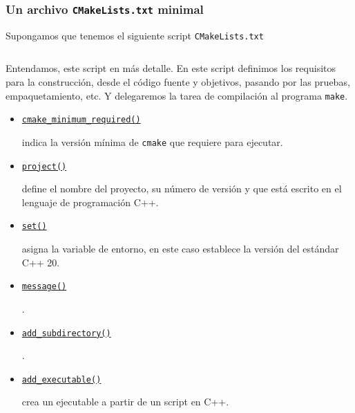\begin{frame}[fragile]
	\frametitle{Un archivo \lstinline{CMakeLists.txt} minimal}
	Supongamos que tenemos el siguiente script \lstinline{CMakeLists.txt}

	\inputminted{cmake}{CMakeList.txt.sample}

	Entendamos, este script en más detalle.
	En este script definimos los requisitos para la construcción, desde
	el código fuente y objetivos, pasando por las pruebas, empaquetamiento, etc.
	Y delegaremos la tarea de compilación al programa \lstinline{make}.

	\begin{itemize}
		\item

		\href{https://cmake.org/cmake/help/latest/command/cmake_minimum_required.html}{\lstinline{cmake_minimum_required()}}

		indica la versión mínima de \lstinline{cmake} que requiere para ejecutar.

		\item
		
		\href{https://cmake.org/cmake/help/latest/command/project.html}{\lstinline{project()}}

		define el nombre del proyecto, su número de versión y que
		está escrito en el lenguaje de programación C++.
		
		\item

		\href{https://cmake.org/cmake/help/latest/command/set.html}{\lstinline{set()}}

		asigna la variable de entorno, en este caso establece la versión del estándar C++ 20.


		\item

		\href{https://cmake.org/cmake/help/latest/command/message.html}{\lstinline{message()}}
		
		.

		\item

		\href{https://cmake.org/cmake/help/latest/command/add_subdirectory.html}{\lstinline{add_subdirectory()}}

		.

		\item

		\href{https://cmake.org/cmake/help/latest/command/add_executable.html}{\lstinline{add_executable()}}

		crea un ejecutable a partir de un script en C++.
	\end{itemize}
\end{frame}


